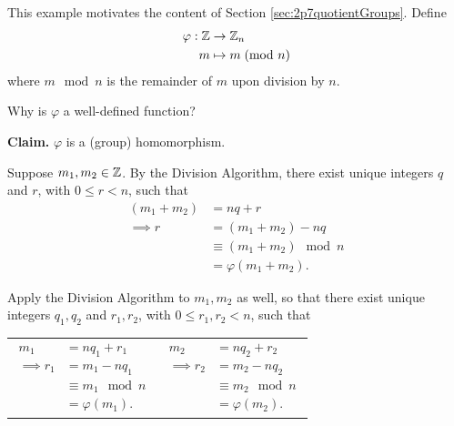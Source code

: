 \documentclass[../algebraNotesMSRI-UP2016.tex]{subfiles}
\begin{document}
\begin{frame}
\begin{ex}\label{ex:ZmodnZ}
This example motivates the content of Section \ref{sec:2p7quotientGroups}.  Define
\begin{align*}
\varphi:\mathbb Z &\to \mathbb Z_n \\
m &\mapsto m\;(\text{mod } n)
\end{align*}
where $m\mod n$ is the remainder of $m$ upon division by $n$.
\end{ex}
\begin{que}
Why is $\varphi$ a well-defined function?
\end{que}

\smallGap
\textbf{Claim.} $\varphi$ is a (group) homomorphism.

\end{frame}

\begin{frame}
\pf  
Suppose $m_1,m_2\in\mathbb Z$.  By the Division Algorithm, there exist unique integers $q$ and $r$, with $0\leq r<n$, such that 
\begin{align*}
(m_1+m_2) &= nq+r \\
\implies r&= (m_1+m_2) -nq \\
	&\equiv (m_1+m_2) \mod n \\
	&= \varphi(m_1+m_2).
\end{align*}

\smallGap
Apply the Division Algorithm to $m_1,m_2$ as well, so that there exist unique integers $q_1,q_2$ and $r_1,r_2$, with $0\leq r_1,r_2<n$, such that 

\vspace{-0.75pc}
\begin{tabular}{p{}p{}}
{\begin{align*}
	m_1 &= nq_1+r_1 \\
	\implies r_1&= m_1 -nq_1 \\
	&\equiv m_1\mod n \\
	&= \varphi(m_1).
\end{align*}
} 
& {\begin{align*}
	m_2 &= nq_2+r_2 \\
	\implies r_2&= m_2 -nq_2 \\
	&\equiv m_2 \mod n \\
	&= \varphi(m_2).
\end{align*}
}
\end{tabular}
\end{frame}
\end{document}
